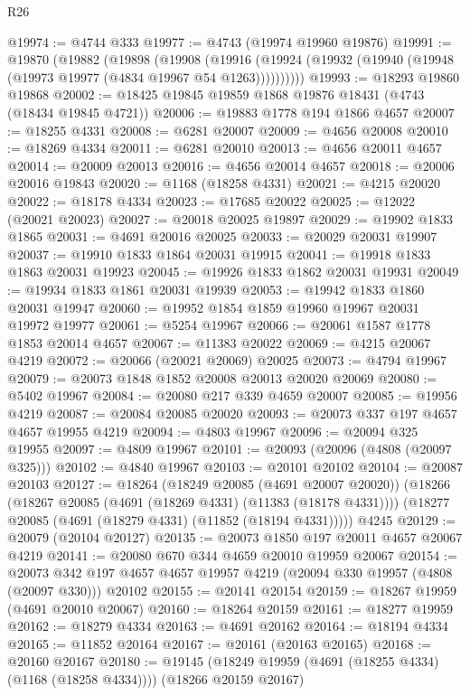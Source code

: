 \begin{lexlean}{R26}
\begin{coremodule}
@19974 := @4744 @333
@19977 := @4743 (@19974 @19960 @19876)
@19991 := @19870
    (@19882
      (@19898
        (@19908
          (@19916 (@19924 (@19932 (@19940 (@19948 (@19973 @19977 (@4834 @19967 @54 @1263))))))))))
@19993 := @18293 @19860 @19868
@20002 := @18425 @19845 @19859 @1868 @19876 @18431 (@4743 (@18434 @19845 @4721))
@20006 := @19883 @1778 @194 @1866 @4657
@20007 := @18255 @4331
@20008 := @6281 @20007
@20009 := @4656 @20008
@20010 := @18269 @4334
@20011 := @6281 @20010
@20013 := @4656 @20011 @4657
@20014 := @20009 @20013
@20016 := @4656 @20014 @4657
@20018 := @20006 @20016 @19843
@20020 := @1168 (@18258 @4331)
@20021 := @4215 @20020
@20022 := @18178 @4334
@20023 := @17685 @20022
@20025 := @12022 (@20021 @20023)
@20027 := @20018 @20025 @19897
@20029 := @19902 @1833 @1865
@20031 := @4691 @20016 @20025
@20033 := @20029 @20031 @19907
@20037 := @19910 @1833 @1864 @20031 @19915
@20041 := @19918 @1833 @1863 @20031 @19923
@20045 := @19926 @1833 @1862 @20031 @19931
@20049 := @19934 @1833 @1861 @20031 @19939
@20053 := @19942 @1833 @1860 @20031 @19947
@20060 := @19952 @1854 @1859 @19960 @19967 @20031 @19972 @19977
@20061 := @5254 @19967
@20066 := @20061 @1587 @1778 @1853 @20014 @4657
@20067 := @11383 @20022
@20069 := @4215 @20067 @4219
@20072 := @20066 (@20021 @20069) @20025
@20073 := @4794 @19967
@20079 := @20073 @1848 @1852 @20008 @20013 @20020 @20069
@20080 := @5402 @19967
@20084 := @20080 @217 @339 @4659 @20007
@20085 := @19956 @4219
@20087 := @20084 @20085 @20020
@20093 := @20073 @337 @197 @4657 @4657 @19955 @4219
@20094 := @4803 @19967
@20096 := @20094 @325 @19955
@20097 := @4809 @19967
@20101 := @20093 (@20096 (@4808 (@20097 @325)))
@20102 := @4840 @19967
@20103 := @20101 @20102
@20104 := @20087 @20103
@20127 := @18264
    (@18249 @20085 (@4691 @20007 @20020))
    (@18266
      (@18267 @20085 (@4691 (@18269 @4331) (@11383 (@18178 @4331))))
      (@18277 @20085 (@4691 (@18279 @4331) (@11852 (@18194 @4331)))))
    @4245
@20129 := @20079 (@20104 @20127)
@20135 := @20073 @1850 @197 @20011 @4657 @20067 @4219
@20141 := @20080 @670 @344 @4659 @20010 @19959 @20067
@20154 := @20073
    @342
    @197
    @4657
    @4657
    @19957
    @4219
    (@20094 @330 @19957 (@4808 (@20097 @330)))
    @20102
@20155 := @20141 @20154
@20159 := @18267 @19959 (@4691 @20010 @20067)
@20160 := @18264 @20159
@20161 := @18277 @19959
@20162 := @18279 @4334
@20163 := @4691 @20162
@20164 := @18194 @4334
@20165 := @11852 @20164
@20167 := @20161 (@20163 @20165)
@20168 := @20160 @20167
@20180 := @19145
    (@18249 @19959 (@4691 (@18255 @4334) (@1168 (@18258 @4334))))
    (@18266 @20159 @20167)

\end{coremodule}
\end{lexlean}
